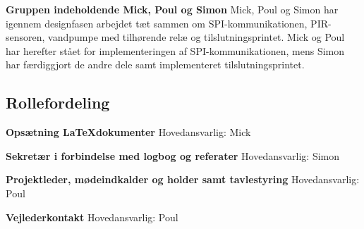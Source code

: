 \textbf{Gruppen indeholdende Mick, Poul og Simon} \newline
Mick, Poul og Simon har igennem designfasen arbejdet tæt sammen om SPI-kommunikationen, PIR-sensoren, vandpumpe med tilhørende relæ og tilslutningsprintet. Mick og Poul har herefter stået for implementeringen af SPI-kommunikationen, mens Simon har færdiggjort de andre dele samt implementeret tilslutningsprintet.


\subsection{Rollefordeling}

\textbf{Opsætning \LaTeX dokumenter} \newline
Hovedansvarlig: Mick 

\textbf{Sekretær i forbindelse med logbog og referater} \newline
Hovedansvarlig: Simon

\textbf{Projektleder, mødeindkalder og holder samt tavlestyring } \newline
Hovedansvarlig: Poul

\textbf{Vejlederkontakt} \newline
Hovedansvarlig: Poul   
